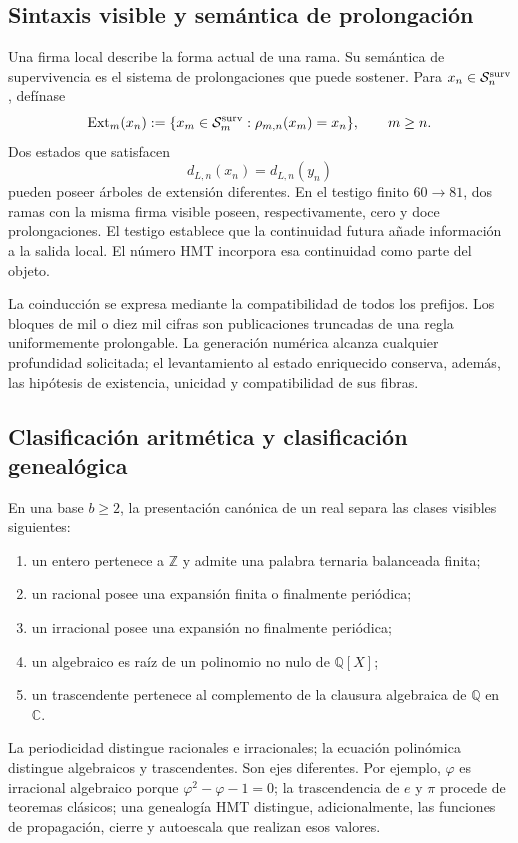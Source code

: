 \subsection{Sintaxis visible y semántica de prolongación}

Una firma local describe la forma actual de una rama. Su semántica de
supervivencia es el sistema de prolongaciones que puede sostener. Para
\(x_n\in\mathcal S_n^{\rm surv}\), defínase
\[
 \operatorname{Ext}_m(x_n)
 :=\{x_m\in\mathcal S_m^{\rm surv}:\rho_{m,n}(x_m)=x_n\},
 \qquad m\geq n.
\]
Dos estados que satisfacen
\[
 d_{L,n}(x_n)=d_{L,n}(y_n)
\]
pueden poseer árboles de extensión diferentes. En el testigo finito
\(60\to81\), dos ramas con la misma firma visible poseen, respectivamente,
cero y doce prolongaciones. El testigo establece que la continuidad futura
añade información a la salida local. El número HMT incorpora esa continuidad
como parte del objeto.

La coinducción se expresa mediante la compatibilidad de todos los prefijos.
Los bloques de mil o diez mil cifras son publicaciones truncadas de una regla
uniformemente prolongable. La generación numérica alcanza cualquier
profundidad solicitada; el levantamiento al estado enriquecido conserva,
además, las hipótesis de existencia, unicidad y compatibilidad de sus fibras.

\subsection{Clasificación aritmética y clasificación genealógica}

En una base \(b\geq2\), la presentación canónica de un real separa las clases
visibles siguientes:
\begin{enumerate}
\item un entero pertenece a \(\mathbb Z\) y admite una palabra ternaria
      balanceada finita;
\item un racional posee una expansión finita o finalmente periódica;
\item un irracional posee una expansión no finalmente periódica;
\item un algebraico es raíz de un polinomio no nulo de \(\mathbb Q[X]\);
\item un trascendente pertenece al complemento de la clausura algebraica de
      \(\mathbb Q\) en \(\mathbb C\).
\end{enumerate}
La periodicidad distingue racionales e irracionales; la ecuación polinómica
distingue algebraicos y trascendentes. Son ejes diferentes. Por ejemplo,
\(\varphi\) es irracional algebraico porque
\(\varphi^2-\varphi-1=0\); la trascendencia de \(e\) y \(\pi\) procede de
teoremas clásicos; una genealogía HMT distingue, adicionalmente, las
funciones de propagación, cierre y autoescala que realizan esos valores.

